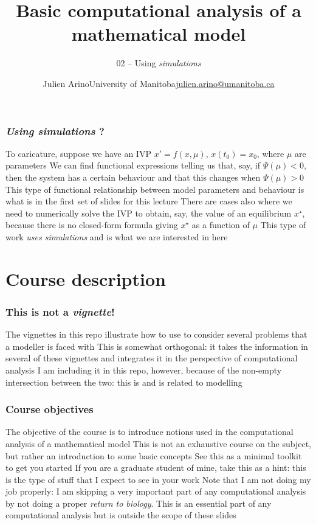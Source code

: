 \documentclass[aspectratio=169]{beamer}\usepackage[]{graphicx}\usepackage[]{xcolor}
\title[Basic computational analysis]{Basic computational analysis of a mathematical model}
\subtitle{02 -- Using \textit{simulations}}
\author{\texorpdfstring{Julien Arino\newline University of Manitoba\newline\url{julien.arino@umanitoba.ca}}{Julien Arino}}
\date{}
\begin{document}

\begin{frame}\frametitle{\emph{Using simulations} ?}
To caricature, suppose we have an IVP $x'=f(x,\mu)$, $x(t_0)=x_0$, where $\mu$ are parameters
\vfill
We can find functional expressions telling us that, say, if $\Psi(\mu)<0$, then the system has a certain behaviour and that this changes when $\Psi(\mu)>0$
\vfill
This type of functional relationship between model parameters and behaviour is what is in the first set of slides for this lecture
\vfill
There are cases also where we need to numerically solve the IVP to obtain, say, the value of an equilibrium $x^\star$, because there is no closed-form formula giving $x^\star$ as a function of $\mu$
\vfill
This type of work \emph{uses simulations} and is what we are interested in here
\end{frame}


\section{Course description}

\begin{frame}\frametitle{This is not a \emph{vignette}!}
The vignettes in this repo illustrate how to use  to consider several problems that a modeller is faced with
\vfill
This is somewhat orthogonal: it takes the information in several of these vignettes and integrates it in the perspective of computational analysis
\vfill
I am including it in this repo, however, because of the non-empty intersection between the two: this is  and is related to modelling
\end{frame}

\begin{frame}\frametitle{Course objectives}
The objective of the course is to introduce notions used in the computational analysis of a mathematical model
\vfill
This is not an exhaustive course on the subject, but rather an introduction to some basic concepts
\vfill
See this as a minimal toolkit to get you started
\vfill
If you are a graduate student of mine, take this as a hint: this is the type of stuff that I expect to see in your work
\vfill
Note that I am not doing my job properly: I am skipping a very important part of any computational analysis by not doing a proper \emph{return to biology}. This is an essential part of any computational analysis but is outside the scope of these slides
\end{frame}
\end{document}
